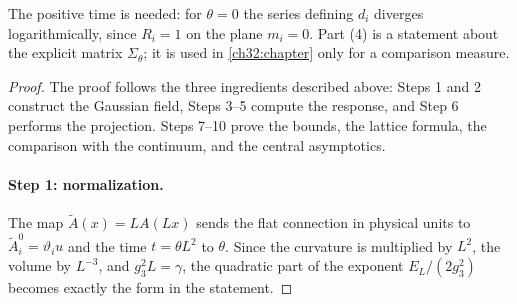 The positive time is needed: for $\theta=0$ the series defining $d_i$ diverges logarithmically, since $R_i=1$ on the plane $m_i=0$. Part (4) is a statement about the explicit matrix $\Sigma_\theta$; it is used in \cref{ch32:chapter} only for a comparison measure.

\begin{proof}
The proof follows the three ingredients described above: Steps 1 and 2 construct the Gaussian field, Steps 3--5 compute the response, and Step 6 performs the projection. Steps 7--10 prove the bounds, the lattice formula, the comparison with the continuum, and the central asymptotics.

\paragraph{Step 1: normalization.}
The map $\widetilde A(x)=LA(Lx)$ sends the flat connection in physical units to $\widetilde A_i^0=\vartheta_iu$ and the time $t=\theta L^2$ to $\theta$. Since the curvature is multiplied by $L^2$, the volume by $L^{-3}$, and $g_3^2L=\gamma$, the quadratic part of the exponent $E_L/(2g_3^2)$ becomes exactly the form in the statement.


\end{proof}
